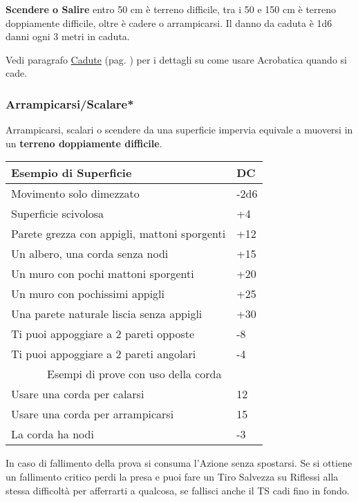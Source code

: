 \begin{multicols}{2}
\textbf{Scendere o Salire} entro 50 cm è terreno difficile, tra i 50 e 150 cm è terreno doppiamente difficile, oltre è cadere o arrampicarsi. Il danno da caduta è 1d6 danni ogni 3 metri in caduta. 

Vedi paragrafo \hyperlink{cadute}{Cadute} (pag. \pageref{cadute}) per i dettagli su come usare Acrobatica quando si cade.


\titlespacing*{\subsubsection}{0pt}{0.5em}{0.5em}\subsubsection*{Arrampicarsi/Scalare*} \label{arrampicarsi}

Arrampicarsi, scalari o scendere da una superficie impervia equivale a muoversi in un \textbf{terreno doppiamente difficile}.

\medskip

\noindent\begin{tabularx}{0.47\textwidth}{Xl}
	\textbf{Esempio di Superficie} & \textbf{DC}\\
	\toprule
	Movimento solo dimezzato & -2d6\\
	Superficie scivolosa&+4\\
	{\small Parete grezza con appigli, mattoni sporgenti}&+12\\
	Un albero, una corda senza nodi&+15\\
	Un muro con pochi mattoni sporgenti &+20\\
	Un muro con pochissimi appigli&+25\\
	Una parete naturale liscia senza appigli&+30\\
	Ti puoi appoggiare a 2 pareti opposte&-8\\
	Ti puoi appoggiare a 2 pareti angolari&-4\\
	\midrule
	\multicolumn{2}{c}{Esempi di prove con uso della corda}\\
	Usare una corda per calarsi&12\\
	Usare una corda per arrampicarsi&15\\
	La corda ha nodi & -3
\end{tabularx}

\medskip

In caso di fallimento della prova si consuma l'Azione senza spostarsi. Se si ottiene un fallimento critico perdi la presa e puoi fare un Tiro Salvezza su Riflessi alla stessa difficoltà per afferrarti a qualcosa, se fallisci anche il TS cadi fino in fondo.


\end{multicols}

